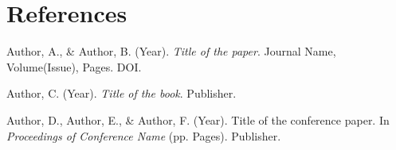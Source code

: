
\newpage
\chapter*{References}

\begin{enumerate}[label={[\arabic*]}]

    \item Author, A., \& Author, B. (Year). \textit{Title of the paper}. Journal Name, Volume(Issue), Pages. DOI.

    \item Author, C. (Year). \textit{Title of the book}. Publisher.

    \item Author, D., Author, E., \& Author, F. (Year). Title of the conference paper. In \textit{Proceedings of Conference Name} (pp. Pages). Publisher.


\end{enumerate}
